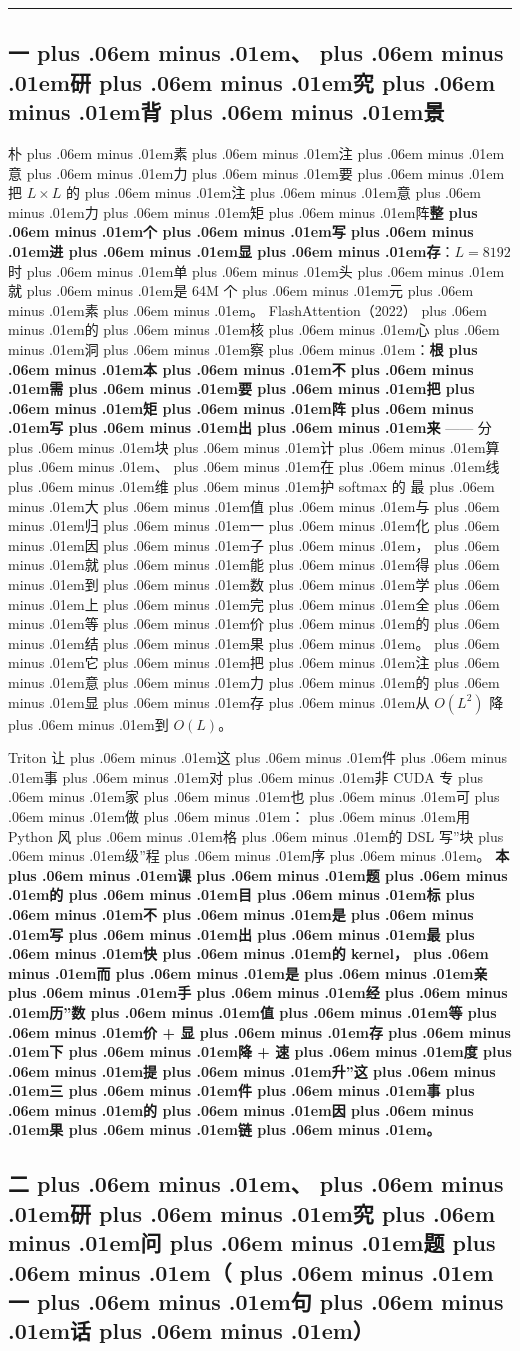 \documentclass[
]{article}
\def\zh#1{{\zhfont #1}}
\def\zhglue{\hskip0pt plus .06em minus .01em}
\begin{document}
\begin{center}\rule{0.5\linewidth}{0.5pt}\end{center}

\subsection{\zh{一\zhglue 、\zhglue 研\zhglue 究\zhglue 背\zhglue 景}}\label{ux4e00ux7814ux7a76ux80ccux666f-3}

\zh{朴\zhglue 素\zhglue 注\zhglue 意\zhglue 力\zhglue 要\zhglue 把} \(L\times L\) \zh{的\zhglue 注\zhglue 意\zhglue 力\zhglue 矩\zhglue 阵}\textbf{\zh{整\zhglue 个\zhglue 写\zhglue 进\zhglue 显\zhglue 存}}\zh{：}\(L=8192\) \zh{时\zhglue 单\zhglue 头\zhglue 就\zhglue 是} 64M \zh{个\zhglue 元\zhglue 素\zhglue 。} FlashAttention\zh{（}2022\zh{）\zhglue 的\zhglue 核\zhglue 心\zhglue 洞\zhglue 察\zhglue ：}\textbf{\zh{根\zhglue 本\zhglue 不\zhglue 需\zhglue 要\zhglue 把\zhglue 矩\zhglue 阵\zhglue 写\zhglue 出\zhglue 来}} ------ \zh{分\zhglue 块\zhglue 计\zhglue 算\zhglue 、\zhglue 在\zhglue 线\zhglue 维\zhglue 护} softmax \zh{的} \zh{最\zhglue 大\zhglue 值\zhglue 与\zhglue 归\zhglue 一\zhglue 化\zhglue 因\zhglue 子\zhglue ，\zhglue 就\zhglue 能\zhglue 得\zhglue 到\zhglue 数\zhglue 学\zhglue 上\zhglue 完\zhglue 全\zhglue 等\zhglue 价\zhglue 的\zhglue 结\zhglue 果\zhglue 。\zhglue 它\zhglue 把\zhglue 注\zhglue 意\zhglue 力\zhglue 的\zhglue 显\zhglue 存\zhglue 从} \(O(L^2)\) \zh{降\zhglue 到} \(O(L)\)\zh{。}

Triton \zh{让\zhglue 这\zhglue 件\zhglue 事\zhglue 对\zhglue 非} CUDA \zh{专\zhglue 家\zhglue 也\zhglue 可\zhglue 做\zhglue ：\zhglue 用} Python \zh{风\zhglue 格\zhglue 的} DSL \zh{写}''\zh{块\zhglue 级}''\zh{程\zhglue 序\zhglue 。} \textbf{\zh{本\zhglue 课\zhglue 题\zhglue 的\zhglue 目\zhglue 标\zhglue 不\zhglue 是\zhglue 写\zhglue 出\zhglue 最\zhglue 快\zhglue 的} kernel\zh{，\zhglue 而\zhglue 是\zhglue 亲\zhglue 手\zhglue 经\zhglue 历}''\zh{数\zhglue 值\zhglue 等\zhglue 价} + \zh{显\zhglue 存\zhglue 下\zhglue 降} + \zh{速\zhglue 度\zhglue 提\zhglue 升}''\zh{这\zhglue 三\zhglue 件\zhglue 事\zhglue 的\zhglue 因\zhglue 果\zhglue 链\zhglue 。}}

\subsection{\zh{二\zhglue 、\zhglue 研\zhglue 究\zhglue 问\zhglue 题\zhglue （\zhglue 一\zhglue 句\zhglue 话\zhglue ）}}\label{ux4e8cux7814ux7a76ux95eeux9898ux4e00ux53e5ux8bdd-3}
\end{document}
